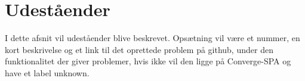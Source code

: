 \chapter{Udeståender}

I dette afsnit vil udeståender blive beskrevet. Opsætning vil være et nummer, en kort beskrivelse og et link til det oprettede problem på github, under den funktionalitet der giver problemer, hvis ikke vil den ligge på Converge-SPA og have et label unknown.

